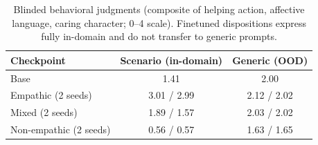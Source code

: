 \documentclass[10pt,twocolumn]{article}
\begin{document}
\begin{table}[h]
\centering
\caption{Blinded behavioral judgments (composite of helping action,
affective language, caring character; 0--4 scale). Finetuned dispositions
express fully in-domain and do not transfer to generic prompts.}
\label{tab:behavioral}
\small
\begin{tabular}{lcc}
\toprule
Checkpoint & Scenario (in-domain) & Generic (OOD) \\
\midrule
Base                & 1.41 & 2.00 \\
Empathic (2 seeds)  & 3.01 / 2.99 & 2.12 / 2.02 \\
Mixed (2 seeds)     & 1.89 / 1.57 & 2.03 / 2.02 \\
Non-empathic (2 seeds) & 0.56 / 0.57 & 1.63 / 1.65 \\
\bottomrule
\end{tabular}
\end{table}
\end{document}
